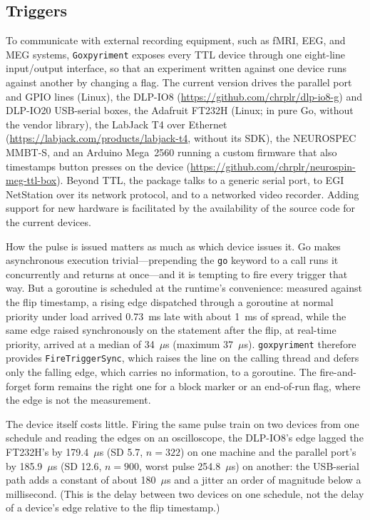 \documentclass[doc,a4paper,floatsintext]{apa7}
\begin{document}
\subsection{Triggers}

To communicate with external recording equipment, such as fMRI, EEG,
and MEG systems, \verb|Goxpyriment| exposes every TTL device through
one eight-line input/output interface, so that an experiment written
against one device runs against another by changing a flag. The
current version drives the parallel port and GPIO lines (Linux), the
DLP-IO8 (\url{https://github.com/chrplr/dlp-io8-g}) and DLP-IO20
USB-serial boxes, the Adafruit FT232H (Linux; in pure Go, without the vendor
library), the LabJack T4 over Ethernet
(\url{https://labjack.com/products/labjack-t4}, without its SDK), the
NEUROSPEC MMBT-S, and an Arduino Mega~2560 running a custom firmware
that also timestamps button presses on the device
(\url{https://github.com/chrplr/neurospin-meg-ttl-box}). Beyond TTL,
the package talks to a generic serial port, to EGI NetStation over its
network protocol, and to a networked video recorder. Adding support
for new hardware is facilitated by the availability of the source code
for the current devices.

How the pulse is issued matters as much as which device issues it.
Go makes asynchronous execution trivial---prepending the \verb|go|
keyword to a call runs it concurrently and returns at once---and it is
tempting to fire every trigger that way. But a goroutine is scheduled
at the runtime's convenience: measured against the flip timestamp, a
rising edge dispatched through a goroutine at normal priority under
load arrived 0.73~ms late with about 1~ms of spread, while the same
edge raised synchronously on the statement after the flip, at
real-time priority, arrived at a median of 34~$\mu$s (maximum
37~$\mu$s). \texttt{goxpyriment} therefore provides
\texttt{FireTriggerSync}, which raises the line on the calling thread
and defers only the falling edge, which carries no information, to a
goroutine. The fire-and-forget form remains the right one for a block
marker or an end-of-run flag, where the edge is not the measurement.

The device itself costs little. Firing the same pulse train on two
devices from one schedule and reading the edges on an oscilloscope,
the DLP-IO8's edge lagged the FT232H's by 179.4~$\mu$s (SD 5.7, $n =
322$) on one machine and the parallel port's by 185.9~$\mu$s (SD 12.6,
$n = 900$, worst pulse 254.8~$\mu$s) on another: the USB-serial path
adds a constant of about 180~$\mu$s and a jitter an order of magnitude
below a millisecond. (This is the delay between two devices on one
schedule, not the delay of a device's edge relative to the flip
timestamp.)
\end{document}
